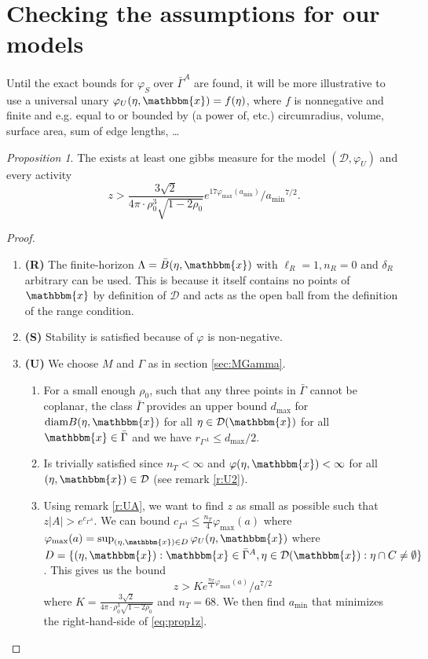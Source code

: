 \documentclass[12pt,a4paper]{article}
\theoremstyle{definition}
\theoremstyle{remark}
\theoremstyle{theorem}
\newtheorem{proposition}{Proposition}
\newcommand{\x}{\mathbbm{x}}
\begin{document}
\section{Checking the assumptions for our models}

 Until the exact bounds for $\varphi_S$ over $\bar\Gamma^A$ are found, it will be more illustrative to use a universal unary $\varphi_U(\eta,\x)=f(\eta)$, where $f$ is nonnegative and finite and e.g. equal to or bounded by (a power of, etc.) circumradius, volume, surface area, sum of edge lengths, \dots


\begin{proposition}
	The exists at least one gibbs measure for the model $(\mathcal D,\varphi_U)$ and every activity
	$$z > \frac{3\sqrt{2}}{4\pi \cdot \rho_0^3 \sqrt{1-2\rho_0}} e^{17 \varphi_{\text{max}}(a_{\text{min}})} / {a_{\text{min}}}^{7/2}.$$
\end{proposition}
\begin{proof}
\begin{enumerate}[]
	\item \textbf{(R)} The finite-horizon $\Lambda = \bar B(\eta,\x)$ with $\ell_R = 1, n_R = 0$ and $\delta_R$ arbitrary can be used. This is because it itself contains no points of $\x$ by definition of $\mathcal D$ and acts as the open ball from the definition of the range condition.
	\item \textbf{(S)} Stability is satisfied because of $\varphi$ is non-negative.
	\item \textbf{(U)} We choose $M$ and $\Gamma$ as in section \ref{sec:MGamma}.
		\begin{enumerate}[(U1)]
			\item For a small enough $\rho_0$, such that any three points in $\bar \Gamma$ cannot be coplanar, the class $\bar\Gamma$ provides an upper bound $d_{\text{max}}$ for $\text{diam} B(\eta,\x)$ for all $\eta \in \mathcal D(\x)$ for all $\x \in \bar \Gamma$ and we have $r_{\Gamma^A} \leq d_{\text{max}} / 2$.  
			\item Is trivially satisfied since $n_T < \infty$ and $\varphi(\eta,\x)<\infty$ for all $(\eta,\x)\in\mathcal D$ (see remark \ref{r:U2}).
			\item Using remark \ref{r:UA}, we want to find $z$ as small as possible such that $z|A| > e^{c_{\Gamma^A}}$. We can bound $c_{\Gamma^A} \leq \frac {n_T}4 \varphi_{\text{max}}(a) $ where $\varphi_{\text{max}}(a) = \sup_{(\eta,\x) \in D} \varphi_U(\eta,\x)$ where $D=\{ (\eta,\x): \x \in \bar\Gamma^A, \eta \in \mathcal D(\x): \eta\cap C \neq \emptyset\}$.  This gives us the bound
				\begin{equation}z > K e^{\frac{n_T}{4} \varphi_{\text{max}}(a)}/a^{7/2}\label{eq:prop1z}\end{equation}
				where $K = \frac{3\sqrt{2}}{4\pi \cdot \rho_0^3 \sqrt{1-2\rho_0}}$ and $n_T = 68$. We then find $a_\text{min}$ that minimizes the right-hand-side of \ref{eq:prop1z}.
		\end{enumerate}
\end{enumerate}
\end{proof}
\end{document}
